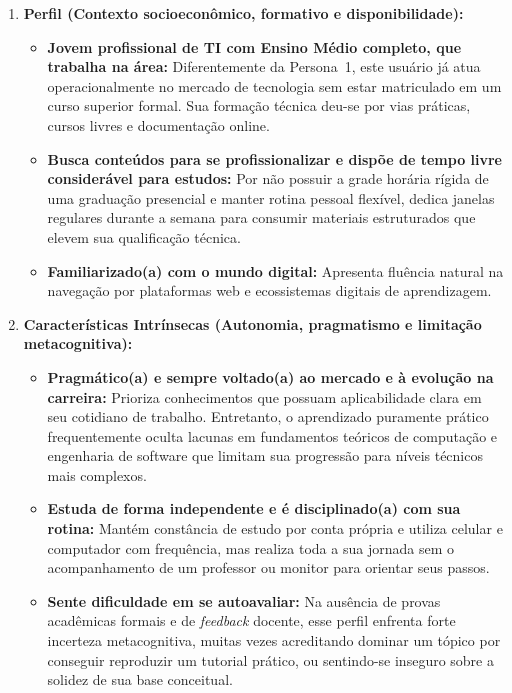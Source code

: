 \begin{enumerate}
    \item \textbf{Perfil (Contexto socioeconômico, formativo e disponibilidade):}
    \begin{itemize}
        \item \textbf{Jovem profissional de TI com Ensino Médio completo, que trabalha na área:} Diferentemente da Persona~1, este usuário já atua operacionalmente no mercado de tecnologia sem estar matriculado em um curso superior formal. Sua formação técnica deu-se por vias práticas, cursos livres e documentação online.
        \item \textbf{Busca conteúdos para se profissionalizar e dispõe de tempo livre considerável para estudos:} Por não possuir a grade horária rígida de uma graduação presencial e manter rotina pessoal flexível, dedica janelas regulares durante a semana para consumir materiais estruturados que elevem sua qualificação técnica.
        \item \textbf{Familiarizado(a) com o mundo digital:} Apresenta fluência natural na navegação por plataformas web e ecossistemas digitais de aprendizagem.
    \end{itemize}

    \item \textbf{Características Intrínsecas (Autonomia, pragmatismo e limitação metacognitiva):}
    \begin{itemize}
        \item \textbf{Pragmático(a) e sempre voltado(a) ao mercado e à evolução na carreira:} Prioriza conhecimentos que possuam aplicabilidade clara em seu cotidiano de trabalho. Entretanto, o aprendizado puramente prático frequentemente oculta lacunas em fundamentos teóricos de computação e engenharia de software que limitam sua progressão para níveis técnicos mais complexos.
        \item \textbf{Estuda de forma independente e é disciplinado(a) com sua rotina:} Mantém constância de estudo por conta própria e utiliza celular e computador com frequência, mas realiza toda a sua jornada sem o acompanhamento de um professor ou monitor para orientar seus passos.
        \item \textbf{Sente dificuldade em se autoavaliar:} Na ausência de provas acadêmicas formais e de \textit{feedback} docente, esse perfil enfrenta forte incerteza metacognitiva, muitas vezes acreditando dominar um tópico por conseguir reproduzir um tutorial prático, ou sentindo-se inseguro sobre a solidez de sua base conceitual.
    \end{itemize}


\end{enumerate}
